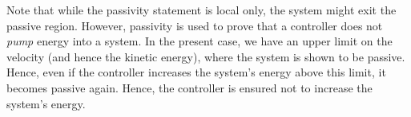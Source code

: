 Note that while the passivity statement is local only, the system might exit the passive region. However, passivity is used to prove that a controller does not \textit{pump} energy into a system. In the present case, we have an upper limit on the velocity (and hence the kinetic energy), where the system is shown to be passive. Hence, even if the controller increases the system's energy above this limit, it becomes passive again. Hence, the controller is ensured not to increase the system's energy.





